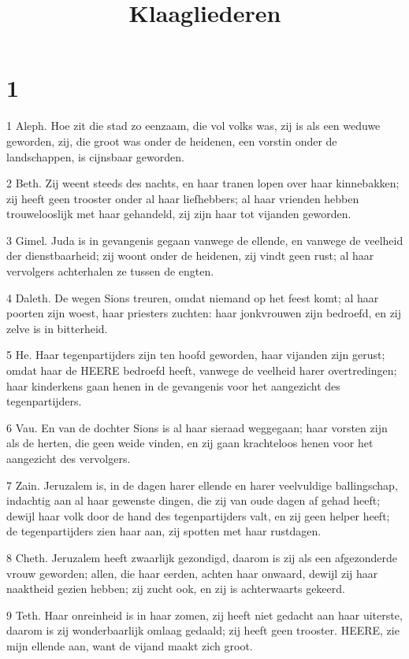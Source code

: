 

\title{Klaagliederen}



\chapter{1}

\par 1 Aleph. Hoe zit die stad zo eenzaam, die vol volks was, zij is als een weduwe geworden, zij, die groot was onder de heidenen, een vorstin onder de landschappen, is cijnsbaar geworden.
\par 2 Beth. Zij weent steeds des nachts, en haar tranen lopen over haar kinnebakken; zij heeft geen trooster onder al haar liefhebbers; al haar vrienden hebben trouwelooslijk met haar gehandeld, zij zijn haar tot vijanden geworden.
\par 3 Gimel. Juda is in gevangenis gegaan vanwege de ellende, en vanwege de veelheid der dienstbaarheid; zij woont onder de heidenen, zij vindt geen rust; al haar vervolgers achterhalen ze tussen de engten.
\par 4 Daleth. De wegen Sions treuren, omdat niemand op het feest komt; al haar poorten zijn woest, haar priesters zuchten: haar jonkvrouwen zijn bedroefd, en zij zelve is in bitterheid.
\par 5 He. Haar tegenpartijders zijn ten hoofd geworden, haar vijanden zijn gerust; omdat haar de HEERE bedroefd heeft, vanwege de veelheid harer overtredingen; haar kinderkens gaan henen in de gevangenis voor het aangezicht des tegenpartijders.
\par 6 Vau. En van de dochter Sions is al haar sieraad weggegaan; haar vorsten zijn als de herten, die geen weide vinden, en zij gaan krachteloos henen voor het aangezicht des vervolgers.
\par 7 Zain. Jeruzalem is, in de dagen harer ellende en harer veelvuldige ballingschap, indachtig aan al haar gewenste dingen, die zij van oude dagen af gehad heeft; dewijl haar volk door de hand des tegenpartijders valt, en zij geen helper heeft; de tegenpartijders zien haar aan, zij spotten met haar rustdagen.
\par 8 Cheth. Jeruzalem heeft zwaarlijk gezondigd, daarom is zij als een afgezonderde vrouw geworden; allen, die haar eerden, achten haar onwaard, dewijl zij haar naaktheid gezien hebben; zij zucht ook, en zij is achterwaarts gekeerd.
\par 9 Teth. Haar onreinheid is in haar zomen, zij heeft niet gedacht aan haar uiterste, daarom is zij wonderbaarlijk omlaag gedaald; zij heeft geen trooster. HEERE, zie mijn ellende aan, want de vijand maakt zich groot.
